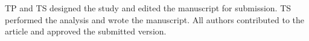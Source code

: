 \label{Perspectives}

\contributions%
{ 

TP and TS designed the study and edited the manuscript for submission. TS performed the analysis and wrote the manuscript. All authors contributed to the article and approved the submitted version.\\[1cm]
}


